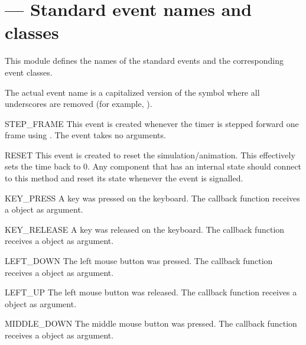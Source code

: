 \section{ ---
         Standard event names and classes}


This module defines the names of the standard events and the corresponding
event classes.

The actual event name is a capitalized version of the symbol where
all underscores are removed (for example, ).

\begin{datadesc}{STEP_FRAME}
This event is created whenever the timer is stepped forward one frame
using . The event takes no arguments.
\end{datadesc}

\begin{datadesc}{RESET}
This event is created to reset the simulation/animation. This
effectively sets the time back to 0. Any component that has an
internal state should connect to this method and reset its state
whenever the event is signalled.
\end{datadesc}

\begin{datadesc}{KEY_PRESS}
A key was pressed on the keyboard. The callback function receives 
a  object as argument.
\end{datadesc}

\begin{datadesc}{KEY_RELEASE}
A key was released on the keyboard. The callback function receives 
a  object as argument.
\end{datadesc}

\begin{datadesc}{LEFT_DOWN}
The left mouse button was pressed. The callback function receives 
a  object as argument.
\end{datadesc}

\begin{datadesc}{LEFT_UP}
The left mouse button was released. The callback function receives 
a  object as argument.
\end{datadesc}

\begin{datadesc}{MIDDLE_DOWN}
The middle mouse button was pressed. The callback function receives 
a  object as argument.
\end{datadesc}

